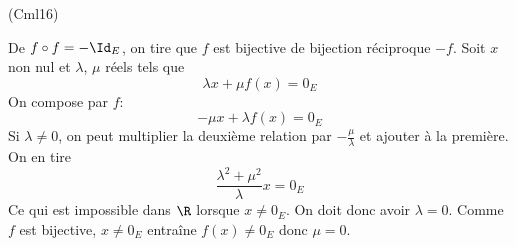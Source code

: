 \begin{tiny}(Cml16)\end{tiny} De $f\circ f= -\Id_E$, on tire que $f$ est bijective de bijection réciproque $-f$.\newline
Soit $x$ non nul et $\lambda$, $\mu$ réels tels que
\begin{displaymath}
  \lambda x + \mu f(x) = 0_E
\end{displaymath}
On compose par $f$:
\begin{displaymath}
  - \mu x + \lambda f(x) = 0_E
\end{displaymath}
Si $\lambda \neq 0$, on peut multiplier la deuxième relation par $-\frac{\mu}{\lambda}$ et ajouter à la première. On en tire
\begin{displaymath}
  \frac{\lambda^2 + \mu^2}{\lambda} x  = 0_E
\end{displaymath}
Ce qui est impossible dans $\R$ lorsque $x\neq 0_E$. On doit donc avoir $\lambda = 0$. Comme $f$ est bijective, $x\neq 0_E$ entraîne $f(x)\neq 0_E$ donc $\mu=0$. 